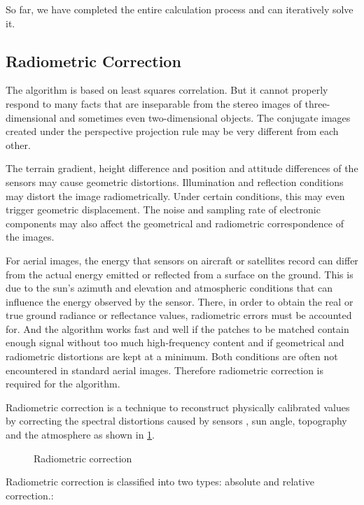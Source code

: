 So far, we have completed the entire calculation process and can iteratively solve it.
\subsection{Radiometric Correction}\label{subsec:Radiometric Correction}
The algorithm is based on least squares correlation. But it cannot properly respond to many facts that are inseparable from the stereo images of three-dimensional and sometimes even two-dimensional objects. The conjugate images created under the perspective projection rule may be very different from each other.

The terrain gradient, height difference and position and attitude differences of the sensors may cause geometric distortions. Illumination and reflection conditions may distort the image radiometrically. Under certain conditions, this may even trigger geometric displacement. The noise and sampling rate of electronic components may also affect the geometrical and radiometric correspondence of the images. 

For aerial images, the energy that sensors on aircraft or satellites record can differ from the actual energy emitted or reflected from a surface on the ground. This is due to the sun's azimuth and elevation and atmospheric conditions that can influence the energy observed by the sensor. There, in order to obtain the real or true ground radiance or reflectance values, radiometric errors must be accounted for. And the algorithm works fast and well if the patches to be matched contain enough signal without too much high-frequency content and if geometrical and radiometric distortions are kept at a minimum. Both conditions are often not encountered in standard aerial images. Therefore radiometric correction is required for the algorithm.

Radiometric correction is a technique to reconstruct physically calibrated values by correcting the spectral distortions caused by sensors , sun angle, topography and the atmosphere as shown in \cref{fig:Radiometric Correction}.
\begin{figure}[tbp]
	\centering
	
	\caption{Radiometric correction}
	\label{fig:Radiometric Correction}
\end{figure}

Radiometric correction is classified into two types: absolute and relative correction.:

